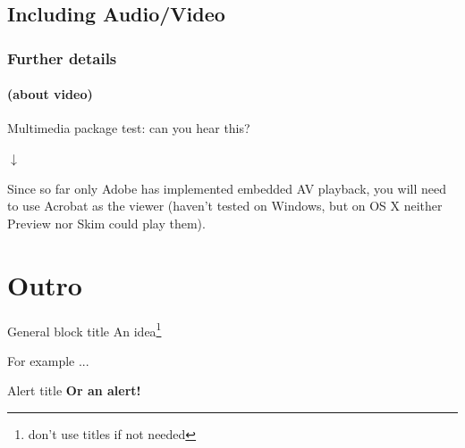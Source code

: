 \documentclass{beamer}
\begin{document}
\subsection[av]{Including Audio/Video}

\begin{frame}\frametitle{Further details}\framesubtitle{(about video)}
{
\centering
Multimedia package test: can you hear this?

$\downarrow$


\scriptsize
Since so far only Adobe has implemented embedded AV playback, you will need to use Acrobat as the viewer (haven't tested on Windows, but on OS X neither Preview nor Skim could play them).

}


\end{frame}


\section[Outro]{Outro}
\begin{frame}[plain]
    \tableofcontents[currentsection]
\end{frame}
\addtocounter{framenumber}{-1}  %

\begin{frame}

    \begin{block}{General block title}
    An idea\footnote{don't use titles if not needed}
    \end{block}

    \begin{example}[ex. 1]
    For example ...
    \end{example}

    \begin{alertblock}{Alert title}
    \centering
    \textbf{Or an alert!}
    \end{alertblock}

\end{frame}
\end{document}
